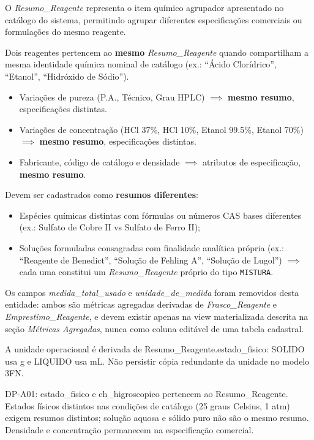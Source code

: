 \begin{explicacao}
O \textit{Resumo\_Reagente} representa o item químico agrupador apresentado no catálogo do sistema, permitindo agrupar diferentes especificações comerciais ou formulações do mesmo reagente.

Dois reagentes pertencem ao \textbf{mesmo} \textit{Resumo\_Reagente} quando compartilham a mesma identidade química nominal de catálogo (ex.: ``Ácido Clorídrico'', ``Etanol'', ``Hidróxido de Sódio'').
\begin{itemize}
    \item Variações de pureza (P.A., Técnico, Grau HPLC) $\implies$ \textbf{mesmo resumo}, especificações distintas.
    \item Variações de concentração (HCl 37\%, HCl 10\%, Etanol 99.5\%, Etanol 70\%) $\implies$ \textbf{mesmo resumo}, especificações distintas.
    \item Fabricante, código de catálogo e densidade $\implies$ atributos de especificação, \textbf{mesmo resumo}.
\end{itemize}
Devem ser cadastrados como \textbf{resumos diferentes}:
\begin{itemize}
    \item Espécies químicas distintas com fórmulas ou números CAS bases diferentes (ex.: Sulfato de Cobre II vs Sulfato de Ferro II);
    \item Soluções formuladas consagradas com finalidade analítica própria (ex.: ``Reagente de Benedict'', ``Solução de Fehling A'', ``Solução de Lugol'') $\implies$ cada uma constitui um \textit{Resumo\_Reagente} próprio do tipo \texttt{MISTURA}.
\end{itemize}

Os campos \textit{medida\_total\_usado} e \textit{unidade\_de\_medida} foram removidos desta entidade: ambos são métricas agregadas derivadas de \textit{Frasco\_Reagente} e \textit{Emprestimo\_Reagente}, e devem existir apenas na view materializada descrita na seção \textit{Métricas Agregadas}, nunca como coluna editável de uma tabela cadastral.

A unidade operacional é derivada de Resumo\_Reagente.estado\_fisico: SOLIDO usa g e LIQUIDO usa mL. Não persistir cópia redundante da unidade no modelo 3FN.

DP-A01: estado\_fisico e eh\_higroscopico pertencem ao Resumo\_Reagente. Estados físicos distintos nas condições de catálogo (25 graus Celsius, 1 atm) exigem resumos distintos; solução aquosa e sólido puro não são o mesmo resumo. Densidade e concentração permanecem na especificação comercial.


\end{explicacao}

